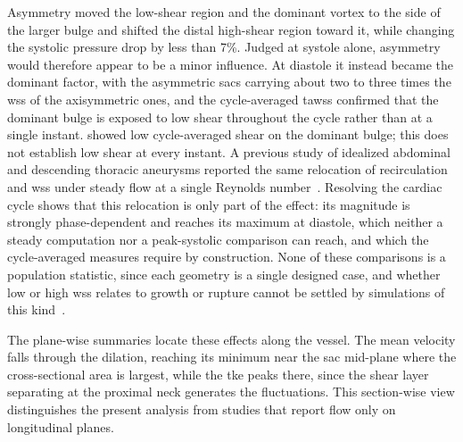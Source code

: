 \documentclass[12pt,a4paper]{article}
\newcommand{\cfdrevision}[1]{#1} %
\newcommand{\WSS}{\ac{wss}\xspace}
\newcommand{\TAWSS}{\ac{tawss}\xspace}
\newcommand{\TKE}{\ac{tke}\xspace}
\theoremstyle{definition}
\numberwithin{equation}{section}
\providecommand{\DIFaddtex}[1]{{\protect\color{blue} \sf #1}} %
\providecommand{\DIFdeltex}[1]{{\protect\color{red} \scriptsize #1}} %
\providecommand{\DIFaddbegin}{} %
\providecommand{\DIFaddend}{} %
\providecommand{\DIFdelbegin}{} %
\providecommand{\DIFdelend}{} %
\providecommand{\DIFadd}[1]{\texorpdfstring{\DIFaddtex{#1}}{#1}} %
\providecommand{\DIFdel}[1]{\texorpdfstring{\DIFdeltex{#1}}{}} %
\newcommand{\DIFscaledelfig}{0.5}
\newlength{\DIFdelgraphicswidth} %
\newlength{\DIFdelgraphicsheight} %
\newcommand{\DIFaddincludegraphics}[2][]{{\color{blue}\fbox{\DIFOincludegraphics[#1]{#2}}}} %
\newcommand{\DIFdelincludegraphics}[2][]{%
\sbox{\DIFdelgraphicsbox}{\DIFOincludegraphics[#1]{#2}}%
\settoboxwidth{\DIFdelgraphicswidth}{\DIFdelgraphicsbox} %
\settoboxtotalheight{\DIFdelgraphicsheight}{\DIFdelgraphicsbox} %
\scalebox{\DIFscaledelfig}{%
\parbox[b]{\DIFdelgraphicswidth}{\usebox{\DIFdelgraphicsbox}\\[-\baselineskip] \rule{\DIFdelgraphicswidth}{0em}}\llap{\resizebox{\DIFdelgraphicswidth}{\DIFdelgraphicsheight}{%
\setlength{\unitlength}{\DIFdelgraphicswidth}%
\begin{picture}(1,1)%
\thicklines\linethickness{2pt} %
{\color[rgb]{1,0,0}\put(0,0){\framebox(1,1){}}}%
{\color[rgb]{1,0,0}\put(0,0){\line( 1,1){1}}}%
{\color[rgb]{1,0,0}\put(0,1){\line(1,-1){1}}}%
\end{picture}%
}\hspace*{3pt}}} %
} %
\DeclareRobustCommand{\DIFaddbegin}{\DIFOaddbegin \let\includegraphics\DIFaddincludegraphics} %
\DeclareRobustCommand{\DIFaddend}{\DIFOaddend \let\includegraphics\DIFOincludegraphics} %
\DeclareRobustCommand{\DIFdelbegin}{\DIFOdelbegin \let\includegraphics\DIFdelincludegraphics} %
\DeclareRobustCommand{\DIFdelend}{\DIFOaddend \let\includegraphics\DIFOincludegraphics} %
\begin{document}
Asymmetry moved the low-shear region and the dominant vortex to the side of the larger bulge and shifted the distal high-shear region toward it, while changing the systolic pressure drop by less than 7\%. Judged at systole alone, asymmetry would therefore appear to be a minor influence. At diastole it instead became the dominant factor, with the asymmetric sacs carrying about two to three times the \WSS of the axisymmetric ones, and the cycle-averaged \TAWSS \DIFdelbegin \DIFdel{confirmed that the dominant bulge is exposed to low shear throughout the cycle rather than at a single instant. }\DIFdelend \DIFaddbegin \DIFadd{\cfdrevision{showed low cycle-averaged shear on the dominant bulge; this does not establish low shear at every instant.} }\DIFaddend A previous study of idealized abdominal and descending thoracic aneurysms reported the same relocation of recirculation and \WSS under steady flow at a single Reynolds number~\cite{rehman2024comparative}. Resolving the cardiac cycle shows that this relocation is only part of the effect: its magnitude is strongly phase-dependent and reaches its maximum at diastole, which neither a steady computation nor a peak-systolic comparison can reach, and which the cycle-averaged measures require by construction. None of these comparisons is a population statistic, since each geometry is a single designed case, and whether low or high \WSS relates to growth or rupture cannot be settled by simulations of this kind~\cite{geers2017wall,lipp2020computational}.

The plane-wise summaries locate these effects along the vessel. The mean velocity falls through the dilation, reaching its minimum near the sac mid-plane where the cross-sectional area is largest, while the \TKE peaks there, since the shear layer separating at the proximal neck generates the fluctuations. This section-wise view distinguishes the present analysis from studies that report flow only on longitudinal planes.
\end{document}
